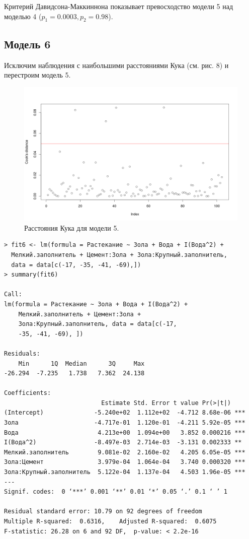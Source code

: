 \documentclass[10pt]{article}
\begin{document}
Критерий Давидсона-Маккиннона показывает превосходство модели 5 над моделью 4 ($p_1 = 0.0003, p_2 = 0.98$).

\subsection{Модель 6}

Исключим наблюдения с наибольшими расстояниями Кука (см. рис. 8) и перестроим модель 5.

\begin{figure}[h]
  \centering
  \includegraphics[scale=0.4]{cooks.png}
  \caption{Расстояния Кука для модели 5.}
\end{figure}

\begin{verbatim}
> fit6 <- lm(formula = Растекание ~ Зола + Вода + I(Вода^2) +
  Мелкий.заполнитель + Цемент:Зола + Зола:Крупный.заполнитель,
  data = data[c(-17, -35, -41, -69),])
> summary(fit6)

Call:
lm(formula = Растекание ~ Зола + Вода + I(Вода^2) + 
    Мелкий.заполнитель + Цемент:Зола + 
    Зола:Крупный.заполнитель, data = data[c(-17, 
    -35, -41, -69), ])

Residuals:
    Min      1Q  Median      3Q     Max 
-26.294  -7.235   1.738   7.362  24.138 

Coefficients:
                           Estimate Std. Error t value Pr(>|t|)    
(Intercept)              -5.240e+02  1.112e+02  -4.712 8.68e-06 ***
Зола                     -4.717e-01  1.120e-01  -4.211 5.92e-05 ***
Вода                      4.213e+00  1.094e+00   3.852 0.000216 ***
I(Вода^2)                -8.497e-03  2.714e-03  -3.131 0.002333 ** 
Мелкий.заполнитель        9.081e-02  2.160e-02   4.205 6.05e-05 ***
Зола:Цемент               3.979e-04  1.064e-04   3.740 0.000320 ***
Зола:Крупный.заполнитель  5.122e-04  1.137e-04   4.503 1.96e-05 ***
---
Signif. codes:  0 ‘***’ 0.001 ‘**’ 0.01 ‘*’ 0.05 ‘.’ 0.1 ‘ ’ 1

Residual standard error: 10.79 on 92 degrees of freedom
Multiple R-squared:  0.6316,	Adjusted R-squared:  0.6075 
F-statistic: 26.28 on 6 and 92 DF,  p-value: < 2.2e-16
\end{verbatim}
\end{document}
